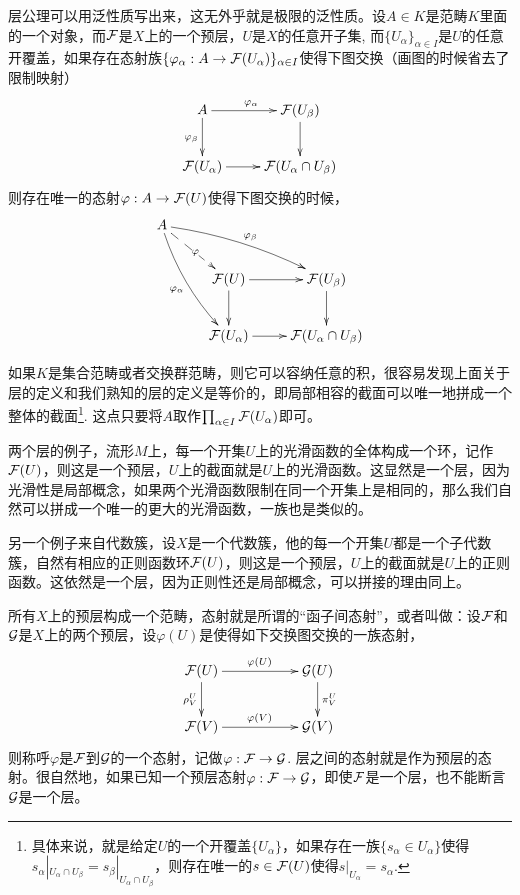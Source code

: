 层公理可以用泛性质写出来，这无外乎就是极限的泛性质。设$A\in K$是范畴$K$里面的一个对象，而$\mathcal{F}$是$X$上的一个预层，$U$是$X$的任意开子集, 而$\{U_\alpha\}_{\alpha\in I}$是$U$的任意开覆盖，如果存在态射族$\{\varphi_\alpha:A\to \mathcal{F}(U_\alpha)\}_{\alpha\in I}$使得下图交换（画图的时候省去了限制映射）
\[
	\xymatrix{
		A\ar[r]^{\varphi_{\alpha}}\ar[d]_{\varphi_{\beta}}&\calf(U_\beta)\ar[d]\\
		\calf(U_\alpha)\ar[r]&\calf(U_{\alpha}\cap U_{\beta})
	}
\]
则存在唯一的态射$\varphi:A\to \mathcal{F}(U)$使得下图交换的时候，
\[
	\xymatrix{
		A\ar@/_/[ddr]_{\varphi_{\alpha}}\ar@/^/[drr]^{\varphi_{\beta}}\ar@{-->}[dr]|{\varphi}&& \\
		&\calf(U)\ar[r]\ar[d]&\calf(U_\beta)\ar[d]\\
		&\calf(U_\alpha)\ar[r]&\calf(U_{\alpha}\cap U_{\beta})
	}
\]

如果$K$是集合范畴或者交换群范畴，则它可以容纳任意的积，很容易发现上面关于层的定义和我们熟知的层的定义是等价的，即局部相容的截面可以唯一地拼成一个整体的截面\footnote{具体来说，就是给定$U$的一个开覆盖$\{U_\alpha\}$，如果存在一族$\{s_\alpha\in U_\alpha\}$使得$s_\alpha|_{U_\alpha\cap U_\beta}=s_\beta|_{U_\alpha\cap U_\beta}$，则存在唯一的$s\in \mathcal{F}(U)$使得$s|_{U_\alpha}=s_\alpha$.}. 这点只要将$A$取作$\prod_{\alpha\in I}\mathcal{F}(U_\alpha)$即可。

\begin{para}
两个层的例子，流形$M$上，每一个开集$U$上的光滑函数的全体构成一个环，记作$\mathcal{F}(U)$，则这是一个预层，$U$上的截面就是$U$上的光滑函数。这显然是一个层，因为光滑性是局部概念，如果两个光滑函数限制在同一个开集上是相同的，那么我们自然可以拼成一个唯一的更大的光滑函数，一族也是类似的。

另一个例子来自代数簇，设$X$是一个代数簇，他的每一个开集$U$都是一个子代数簇，自然有相应的正则函数环$\mathcal{F}(U)$，则这是一个预层，$U$上的截面就是$U$上的正则函数。这依然是一个层，因为正则性还是局部概念，可以拼接的理由同上。
\end{para}

\begin{para}
所有$X$上的预层构成一个范畴，态射就是所谓的“函子间态射”，或者叫做：设$\mathcal{F}$和$\mathcal{G}$是$X$上的两个预层，设$\varphi(U)$是使得如下交换图交换的一族态射，
\[
	\xymatrix{
		\calf(U)\ar[rr]^{\varphi(U)} \ar[d]_{\rho^U_V}&&\calg(U) \ar[d]^{\pi^U_V}\\
		\calf(V)\ar[rr]^{\varphi(V)}&&\calg(V)
	}
\]
则称呼$\varphi$是$\mathcal{F}$到$\mathcal{G}$的一个态射，记做$\varphi:\mathcal{F}\to\mathcal{G}$. 层之间的态射就是作为预层的态射。很自然地，如果已知一个预层态射$\varphi:\mathcal{F}\to\mathcal{G}$，即使$\mathcal{F}$是一个层，也不能断言$\mathcal{G}$是一个层。
\end{para}

